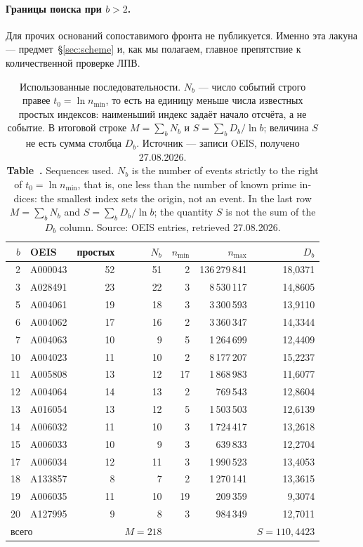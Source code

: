 \documentclass[11pt,a4paper]{article}
\newcommand{\encaptab}[1]{\\[3pt]\foreignlanguage{english}{%
  \textbf{Table~\thetable.} #1}}
\theoremstyle{plain}
\theoremstyle{remark}
\begin{document}
\paragraph{Границы поиска при $b>2$.} Для прочих оснований сопоставимого фронта не
публикуется. Именно эта лакуна --- предмет~\S\ref{sec:scheme} и, как мы полагаем,
главное препятствие к количественной проверке ЛПВ.

\begin{table}[t]
\centering
\caption{Использованные последовательности. $N_b$ --- число событий строго правее
$t_0=\ln n_{\min}$, то есть на единицу меньше числа известных простых индексов:
наименьший индекс задаёт начало отсчёта, а не событие. В итоговой строке
$M=\sum_b N_b$ и $S=\sum_b D_b/\ln b$; величина $S$ не есть сумма столбца $D_b$.
Источник --- записи OEIS, получено 27.08.2026.
\encaptab{Sequences used. $N_b$ is the number of events strictly to the right of
$t_0=\ln n_{\min}$, that is, one less than the number of known prime indices: the
smallest index sets the origin, not an event. In the last row $M=\sum_b N_b$ and
$S=\sum_b D_b/\ln b$; the quantity $S$ is not the sum of the $D_b$ column. Source:
OEIS entries, retrieved 27.08.2026.}}
\label{tab:data}
\small
\begin{tabular}{rlrrrrr}
\toprule
$b$ & OEIS & простых & $N_b$ & $n_{\min}$ & $n_{\max}$ & $D_b$\\
\midrule
2 & A000043 & 52 & 51 & 2 & 136\,279\,841 & 18{,}0371\\
3 & A028491 & 23 & 22 & 3 & 8\,530\,117 & 14{,}8605\\
5 & A004061 & 19 & 18 & 3 & 3\,300\,593 & 13{,}9110\\
6 & A004062 & 17 & 16 & 2 & 3\,360\,347 & 14{,}3344\\
7 & A004063 & 10 & 9 & 5 & 1\,264\,699 & 12{,}4409\\
10 & A004023 & 11 & 10 & 2 & 8\,177\,207 & 15{,}2237\\
11 & A005808 & 13 & 12 & 17 & 1\,868\,983 & 11{,}6077\\
12 & A004064 & 14 & 13 & 2 & 769\,543 & 12{,}8604\\
13 & A016054 & 13 & 12 & 5 & 1\,503\,503 & 12{,}6139\\
14 & A006032 & 11 & 10 & 3 & 1\,724\,417 & 13{,}2618\\
15 & A006033 & 10 & 9 & 3 & 639\,833 & 12{,}2704\\
17 & A006034 & 12 & 11 & 3 & 1\,990\,523 & 13{,}4053\\
18 & A133857 & 8 & 7 & 2 & 1\,270\,141 & 13{,}3615\\
19 & A006035 & 11 & 10 & 19 & 209\,359 & 9{,}3074\\
20 & A127995 & 9 & 8 & 3 & 984\,349 & 12{,}7011\\
\midrule
\multicolumn{3}{l}{всего} & $M=218$ & & & $S=110{,}4423$\\
\bottomrule
\end{tabular}
\end{table}
\end{document}
